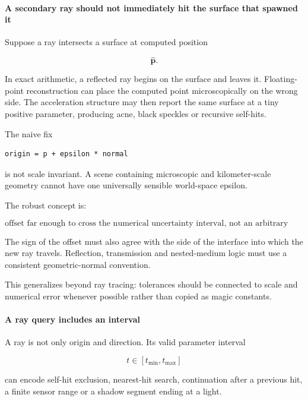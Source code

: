 \paragraph{A secondary ray should not immediately hit the surface that spawned it}\label{a-secondary-ray-should-not-immediately-hit-the-surface-that-spawned-it}

Suppose a ray intersects a surface at computed position

\[
\widehat{\mathbf p}.
\]

In exact arithmetic, a reflected ray begins on the surface and leaves it. Floating-point reconstruction can place the computed point microscopically on the wrong side. The acceleration structure may then report the same surface at a tiny positive parameter, producing acne, black speckles or recursive self-hits.

The naive fix

\begin{verbatim}
origin = p + epsilon * normal
\end{verbatim}

is not scale invariant. A scene containing microscopic and kilometer-scale geometry cannot have one universally sensible world-space epsilon.

The robust concept is:

\[
\boxed{
\text{offset far enough to cross the numerical uncertainty interval,
not an arbitrary visual distance}
}
\]

The sign of the offset must also agree with the side of the interface into which the new ray travels. Reflection, transmission and nested-medium logic must use a consistent geometric-normal convention.

This generalizes beyond ray tracing: tolerances should be connected to scale and numerical error whenever possible rather than copied as magic constants.

\paragraph{A ray query includes an interval}\label{a-ray-query-includes-an-interval}

A ray is not only origin and direction. Its valid parameter interval

\[
t\in[t_{\min},t_{\max}]
\]

can encode self-hit exclusion, nearest-hit search, continuation after a previous hit, a finite sensor range or a shadow segment ending at a light.

